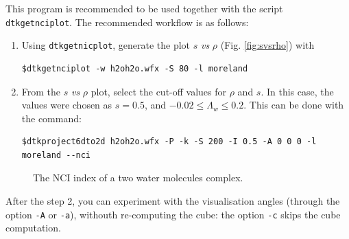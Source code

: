 This program is recommended to be used together with the script \texttt{dtkgetnciplot}. The recommended workflow is as follows:
\begin{enumerate}
	\item Using \texttt{dtkgetnicplot}, generate the plot $s$ \textit{vs} $\rho$ (Fig. \ref{fig:svsrho}) with
	\begin{lstlisting}
$dtkgetnciplot -w h2oh2o.wfx -S 80 -l moreland
	\end{lstlisting}
	\item From the $s$ \textit{vs} $\rho$ plot, select the cut-off values for $\rho$ and $s$. In this case,
	the values were chosen as $s=0.5$, and  $-0.02\leq\Lambda_w\leq0.2$. This can be done with the command:
	\begin{lstlisting}
$dtkproject6dto2d h2oh2o.wfx -P -k -S 200 -I 0.5 -A 0 0 0 -l moreland --nci
	\end{lstlisting}
\end{enumerate}
%
\begin{figure}[hb!]
\centering
{}\quad
{}
\caption{The NCI index of a two water molecules complex.}\label{fig:dtknci}
\end{figure}
%

After the step 2, you can experiment with the visualisation angles (through the option \texttt{-A}
or \texttt{-a}), withouth re-computing the cube: the option \texttt{-c} skips the cube computation.

